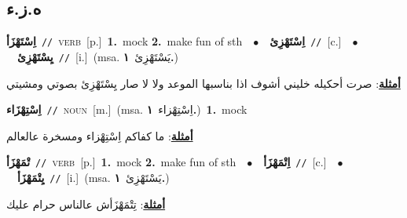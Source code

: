 \documentclass[10pt,a4paper,twoside]{article} %
\begin{document}
\begin{multicols}{2}
\vspace{-3mm}
\subsection*{\color{blue}\foreignlanguage{arabic}{ه.ز.ء}\color{blue}{}} 

{\setlength\topsep{0pt}\textbf{\foreignlanguage{arabic}{اِسْتَهْزَأ}}\ {\color{gray}\texttt{//}\color{black}}\ \textsc{verb}\ [p.]\ \textbf{1.}~mock  \textbf{2.}~make fun of sth\ \ $\bullet$\ \ \setlength\topsep{0pt}\textbf{\foreignlanguage{arabic}{اِسْتَهْزِئ}}\ {\color{gray}\texttt{//}\color{black}}\ [c.]\ \ $\bullet$\ \ \setlength\topsep{0pt}\textbf{\foreignlanguage{arabic}{يِسْتَهْزِئ}}\ {\color{gray}\texttt{//}\color{black}}\ [i.]\ \color{gray}(msa. \foreignlanguage{arabic}{يَسْتَهْزِئ}~\foreignlanguage{arabic}{\textbf{١.}})\color{black}\  \begin{flushright}\color{gray}\foreignlanguage{arabic}{\textbf{\underline{\foreignlanguage{arabic}{أمثلة}}}: صرت أحكيله خليني أشوف اذا بناسبها الموعد ولا لا صار يِسْتَهْزِئ بصوتي ومشيتي}\end{flushright}\color{black}} \vspace{2mm}

{\setlength\topsep{0pt}\textbf{\foreignlanguage{arabic}{اِسْتِهْزَاء}}\ {\color{gray}\texttt{//}\color{black}}\ \textsc{noun}\ [m.]\ \color{gray}(msa. \foreignlanguage{arabic}{اِسْتِهْزاء}~\foreignlanguage{arabic}{\textbf{١.}})\color{black}\ \textbf{1.}~mock\  \begin{flushright}\color{gray}\foreignlanguage{arabic}{\textbf{\underline{\foreignlanguage{arabic}{أمثلة}}}: ما كفاكم اِسْتِهْزاء ومسخرة عالعالم}\end{flushright}\color{black}} \vspace{2mm}

{\setlength\topsep{0pt}\textbf{\foreignlanguage{arabic}{تْمَهْزَأ}}\ {\color{gray}\texttt{//}\color{black}}\ \textsc{verb}\ [p.]\ \textbf{1.}~mock  \textbf{2.}~make fun of sth\ \ $\bullet$\ \ \setlength\topsep{0pt}\textbf{\foreignlanguage{arabic}{اِتْمَهْزَأ}}\ {\color{gray}\texttt{//}\color{black}}\ [c.]\ \ $\bullet$\ \ \setlength\topsep{0pt}\textbf{\foreignlanguage{arabic}{يِتْمَهْزَأ}}\ {\color{gray}\texttt{//}\color{black}}\ [i.]\ \color{gray}(msa. \foreignlanguage{arabic}{يَسْتَهْزِئ}~\foreignlanguage{arabic}{\textbf{١.}})\color{black}\  \begin{flushright}\color{gray}\foreignlanguage{arabic}{\textbf{\underline{\foreignlanguage{arabic}{أمثلة}}}: تِتْمَهْزَأش عالناس حرام عليك}\end{flushright}\color{black}} \vspace{2mm}


\end{multicols}
\end{document}
